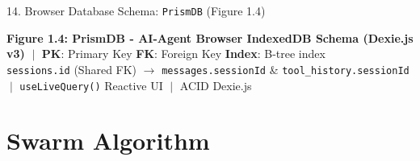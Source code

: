 \documentclass[aspectratio=169,10pt]{beamer}
\begin{document}
\begin{frame}[t]{14. Browser Database Schema: \texttt{PrismDB} (Figure 1.4)}
\vspace{0.08cm}
\begin{tcolorbox}[
  enhanced, arc=3pt, colframe=lavenderDark!60, colback=lavenderLight!30,
  boxrule=0.50pt, left=5pt, right=5pt, top=2pt, bottom=2pt
]
\centering\fontsize{4.6}{5.6}\selectfont\color{lavenderDark}
\textbf{Figure 1.4: PrismDB - AI-Agent Browser IndexedDB Schema (Dexie.js v3)} $\;\vert\;$
\textbf{PK}: Primary Key \enspace \textbf{FK}: Foreign Key \enspace \textbf{Index}: B-tree index\\[1pt]
\texttt{sessions.id} (Shared FK) $\to$ \texttt{messages.sessionId} \& \texttt{tool\_history.sessionId} $\;\vert\;$
\texttt{useLiveQuery()} Reactive UI $\;\vert\;$ ACID Dexie.js
\end{tcolorbox}
\end{frame}

\section{Swarm Algorithm}

\newenvironment{algolist}{%
  \begin{list}{}{%
    \setlength{\labelwidth}{1.9em}%
    \setlength{\leftmargin}{2.1em}%
    \setlength{\itemindent}{0pt}%
    \setlength{\labelsep}{0.45em}%
    \setlength{\itemsep}{0.28em}%
    \setlength{\parsep}{0pt}%
    \setlength{\topsep}{0.1em}%
    \renewcommand{\makelabel}[1]{\textbf{\color{lavenderDark}##1}}%
  }\small%
}{\end{list}}

\newenvironment{algosublist}{%
  \begin{list}{}{%
    \setlength{\labelwidth}{2.4em}%
    \setlength{\leftmargin}{2.8em}%
    \setlength{\itemindent}{0pt}%
    \setlength{\labelsep}{0.4em}%
    \setlength{\itemsep}{0.14em}%
    \setlength{\parsep}{0pt}%
    \setlength{\topsep}{0.1em}%
    \renewcommand{\makelabel}[1]{\textbf{\color{lavenderMedium}##1}}%
  }\small%
}{\end{list}}
\end{document}
